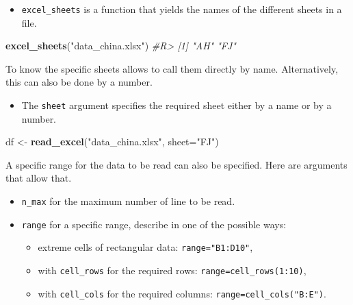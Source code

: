 \documentclass[]{book}
\newenvironment{Shaded}{}{}
\newcommand{\CommentTok}[1]{\textcolor[rgb]{0.38,0.63,0.69}{\textit{#1}}}
\newcommand{\DataTypeTok}[1]{\textcolor[rgb]{0.56,0.13,0.00}{#1}}
\newcommand{\KeywordTok}[1]{\textcolor[rgb]{0.00,0.44,0.13}{\textbf{#1}}}
\newcommand{\NormalTok}[1]{#1}
\newcommand{\StringTok}[1]{\textcolor[rgb]{0.25,0.44,0.63}{#1}}
\providecommand{\tightlist}{%
  \setlength{\itemsep}{0pt}\setlength{\parskip}{0pt}}
\theoremstyle{definition}
\theoremstyle{definition}
\theoremstyle{definition}
\theoremstyle{remark}
\begin{document}
\begin{itemize}
\tightlist
\item
  \texttt{excel\_sheets} is a function that yields the names of the
  different sheets in a file.
\end{itemize}

\begin{Shaded}
\begin{Highlighting}[]
\KeywordTok{excel_sheets}\NormalTok{(}\StringTok{"data_china.xlsx"}\NormalTok{)}
\CommentTok{#R> [1] "AH" "FJ"}
\end{Highlighting}
\end{Shaded}

To know the specific sheets allows to call them directly by name.
Alternatively, this can also be done by a number.

\begin{itemize}
\tightlist
\item
  The \texttt{sheet} argument specifies the required sheet either by a
  name or by a number.
\end{itemize}

\begin{Shaded}
\begin{Highlighting}[]
\NormalTok{df <-}\StringTok{ }\KeywordTok{read_excel}\NormalTok{(}\StringTok{"data_china.xlsx"}\NormalTok{, }\DataTypeTok{sheet=}\StringTok{"FJ"}\NormalTok{) }
\end{Highlighting}
\end{Shaded}

A specific range for the data to be read can also be specified. Here are
arguments that allow that.

\begin{itemize}
\tightlist
\item
  \texttt{n\_max} for the maximum number of line to be read.
\item
  \texttt{range} for a specific range, describe in one of the possible
  ways:

  \begin{itemize}
  \tightlist
  \item
    extreme cells of rectangular data: \texttt{range="B1:D10"},
  \item
    with \texttt{cell\_rows} for the required rows:
    \texttt{range=cell\_rows(1:10)},
  \item
    with \texttt{cell\_cols} for the required columns:
    \texttt{range=cell\_cols("B:E")}.
  \end{itemize}
\end{itemize}
\end{document}
